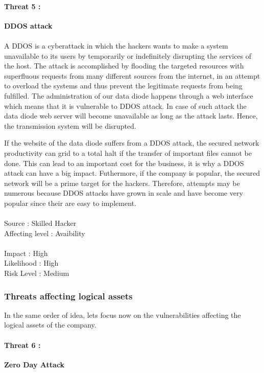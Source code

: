 \documentclass[a4paper,10pt]{article}
\begin{document}
\paragraph{Threat 5 :}  \textbf{DDOS attack} \paragraph{}A DDOS is a cyberattack in which the hackers wants to make a system unavailable to its users by temporarily or indefinitely disrupting the services of the host. The attack is accomplished by flooding the targeted resources with superfluous requests from many different sources from the internet, in an attempt to overload the systems and thus prevent the legitimate requests from being fulfilled. The administration of our data diode happens through a web interface which means that it is vulnerable to DDOS attack. In case of such attack the data diode web server will become unavailable as long as the attack lasts. Hence, the transmission system will be disrupted.

If the website of the data diode suffers from a DDOS attack, the secured network productivity can grid to a total halt if the transfer of important files cannot be done. This can lead to an important cost for the business, it is why a DDOS attack can have a big impact. Futhermore, if the company is popular, the secured network will be a prime target for the hackers. Therefore, attempts may be numerous because DDOS attacks have grown in scale and have become very popular since their are easy to implement.\\ \\
Source : Skilled Hacker \\ 
Affecting level : Avaibility  \\ \\
Impact : High \\
Likelihood : High \\
Risk Level : Medium


\subsubsection{Threats affecting logical assets}
In the same order of idea, lets focus now on the vulnerabilities affecting the logical assets of the company. 

\paragraph{Threat 6 :}  \textbf{Zero Day Attack} 
\end{document}
